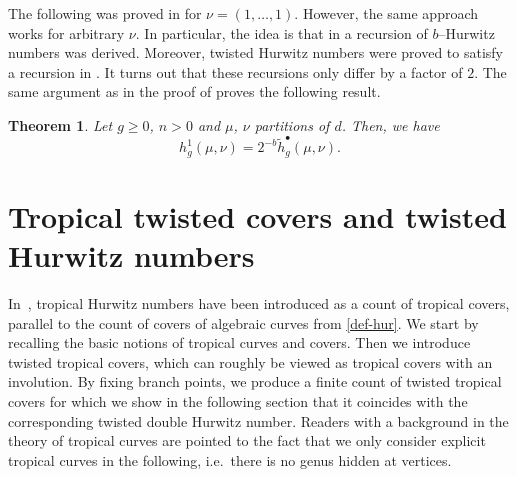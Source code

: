\documentclass[10pt]{amsart}
\theoremstyle{plain}
\theoremstyle{definition}
\theoremstyle{definition}
\theoremstyle{plain}
\theoremstyle{plain}
\theoremstyle{remark}
\theoremstyle{plain}
\newtheorem{theo}[theo]{Theorem}
\theoremstyle{plain}
\begin{document}
The following was proved in \cite[Theorem 3.2]{BF21} for $\nu=(1,\dots,1)$. However, the same approach works for arbitrary $\nu$. In particular, the idea is that in \cite[Theorem 6.5]{chapuy2020non} a recursion of $b$--Hurwitz numbers was derived. Moreover, twisted Hurwitz numbers were proved to satisfy a recursion in \cite[Theorem 2.12]{BF21}. It turns out that these recursions only differ by a factor of $2$. The same argument as in the proof of \cite[Theorem 3.2]{BF21} proves the following result.

\begin{theo}
    Let $g\ge0$, $n>0$ and $\mu$, $\nu$ partitions of $d$. Then, we have
    \begin{equation*}
        h^1_g(\mu,\nu)=2^{-b}\tilde{h}_g^{\bullet}(\mu,\nu).
    \end{equation*}
\end{theo}

\section{Tropical twisted covers and twisted Hurwitz numbers}
\label{sec:troptwist}

In~\cite{CJM10}, tropical Hurwitz numbers have been introduced as a count of tropical covers, parallel to the count of covers of algebraic curves from \cref{def-hur}. We start by recalling the basic notions of tropical curves and covers. Then we introduce twisted tropical covers, which can roughly be viewed as tropical covers with an involution. By fixing branch points, we produce a finite count of twisted tropical covers for which we show in the following section that it coincides with the corresponding twisted double Hurwitz number. Readers with a background in the theory of tropical curves are pointed to the fact that we only consider explicit tropical curves in the following, i.e.\ there is no genus hidden at vertices.
\end{document}
